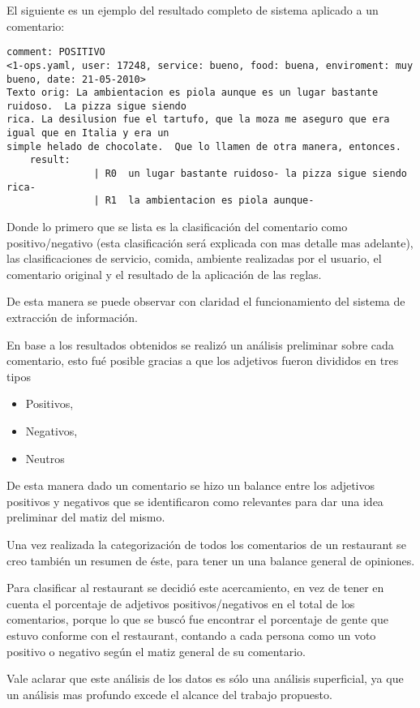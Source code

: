 El siguiente es un ejemplo del resultado completo de sistema aplicado a un comentario:
\begin{verbatim}
comment: POSITIVO
<1-ops.yaml, user: 17248, service: bueno, food: buena, enviroment: muy bueno, date: 21-05-2010>
Texto orig: La ambientacion es piola aunque es un lugar bastante ruidoso.  La pizza sigue siendo
rica. La desilusion fue el tartufo, que la moza me aseguro que era igual que en Italia y era un
simple helado de chocolate.  Que lo llamen de otra manera, entonces. 
	result:
               | R0  un lugar bastante ruidoso- la pizza sigue siendo rica-
               | R1  la ambientacion es piola aunque-
\end{verbatim}
               
Donde lo primero que se lista es la clasificación del comentario como positivo/negativo (esta clasificación será explicada con mas detalle mas adelante), las clasificaciones de servicio, comida, ambiente realizadas por el usuario, el comentario original y el resultado de la aplicación de las reglas.

De esta manera se puede observar con claridad el funcionamiento del sistema de extracción de información.

En base a los resultados obtenidos se realizó un análisis preliminar sobre cada comentario, esto fué posible gracias a que los adjetivos fueron divididos en tres tipos
\begin{itemize}
\item Positivos,
\item Negativos,
\item Neutros
\end{itemize}

De esta manera dado un comentario se hizo un balance entre los adjetivos positivos y negativos que se identificaron como relevantes para dar una idea preliminar del matiz del mismo.

Una vez realizada la categorización de todos los comentarios de un restaurant se creo también un resumen de éste, para tener un una balance general de opiniones.

Para clasificar al restaurant se decidió este acercamiento, en vez de tener en cuenta el porcentaje de adjetivos positivos/negativos en el total de los comentarios, porque lo que se buscó fue encontrar el porcentaje de gente que estuvo conforme con el restaurant, contando a cada persona como un voto positivo o negativo según el matiz general de su comentario.

Vale aclarar que este análisis de los datos es sólo una análisis superficial, ya que un análisis mas profundo excede el alcance del trabajo propuesto.

